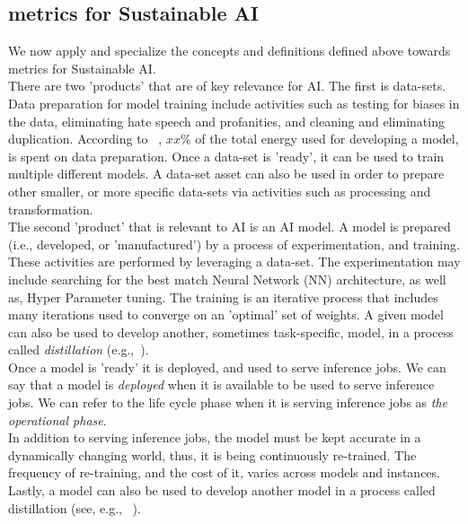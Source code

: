 \subsection{metrics for Sustainable AI} 
We now apply and specialize the concepts and definitions 
defined above towards metrics for Sustainable AI. 
\\
There are two 'products' that are of key relevance for AI. 
The first is data-sets. Data preparation for model training include activities such as testing for biases in the data, eliminating hate speech and profanities, and cleaning and eliminating duplication. According to ~\cite{}, $xx\%$ of the total energy used for developing a model, is spent on data preparation. 
Once a data-set is 'ready', it can be used to train multiple different models. A data-set asset can also be  used in order to prepare other smaller, or more specific data-sets via activities such as processing and transformation.
\\
The second 'product' that is relevant to AI is an AI model. A model is prepared (i.e., developed, or 'manufactured') by
a process of experimentation, and training. These activities
are performed by leveraging a data-set.  
The experimentation may include searching for the best match Neural Network (NN) architecture, 
as well as, Hyper Parameter tuning. The training is an iterative process that includes many iterations used to 
converge on  an 'optimal' set of weights. A given model 
can also be used to develop another, sometimes task-specific, model, in a process called {\em distillation} (e.g.,~\cite{}). 
\\
Once a model is 'ready' it is deployed, and used to serve inference jobs. 
We can say that a model is {\em deployed} when it is available to be used to serve inference jobs. 
We can refer to the life cycle phase when it is serving inference jobs as {\em the operational phase}. 
\\
In addition  to serving inference jobs, the model must be kept accurate in a dynamically changing world,
thus, it is being continuously re-trained. The frequency of re-training, and the cost of it, varies across models and instances. 
Lastly, a model can also be used to develop another model in a process called distillation (see, e.g., ~\cite{}).
\\
